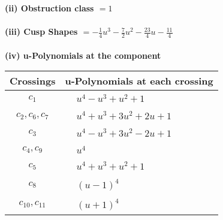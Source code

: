\documentclass[1p]{elsarticle_modified}
\theoremstyle{definition}
\begin{document}
\flushleft \textbf{(ii) Obstruction class $= 1$}\\~\\
\flushleft \textbf{(iii) Cusp Shapes $= -\frac{1}{4} u^3-\frac{7}{2} u^2-\frac{23}{4} u-\frac{11}{4}$}\\~\\
\newpage\renewcommand{\arraystretch}{1}
\flushleft \textbf{(iv) u-Polynomials at the component}\newline \\
\begin{tabular}{m{50pt}|m{274pt}}
Crossings & \hspace{64pt}u-Polynomials at each crossing \\
\hline $$\begin{aligned}c_{1}\end{aligned}$$&$\begin{aligned}
&u^4- u^3+u^2+1
\end{aligned}$\\
\hline $$\begin{aligned}c_{2},c_{6},c_{7}\end{aligned}$$&$\begin{aligned}
&u^4+u^3+3 u^2+2 u+1
\end{aligned}$\\
\hline $$\begin{aligned}c_{3}\end{aligned}$$&$\begin{aligned}
&u^4- u^3+3 u^2-2 u+1
\end{aligned}$\\
\hline $$\begin{aligned}c_{4},c_{9}\end{aligned}$$&$\begin{aligned}
&u^4
\end{aligned}$\\
\hline $$\begin{aligned}c_{5}\end{aligned}$$&$\begin{aligned}
&u^4+u^3+u^2+1
\end{aligned}$\\
\hline $$\begin{aligned}c_{8}\end{aligned}$$&$\begin{aligned}
&(u-1)^4
\end{aligned}$\\
\hline $$\begin{aligned}c_{10},c_{11}\end{aligned}$$&$\begin{aligned}
&(u+1)^4
\end{aligned}$\\
\hline
\end{tabular}\\~\\
\end{document}

